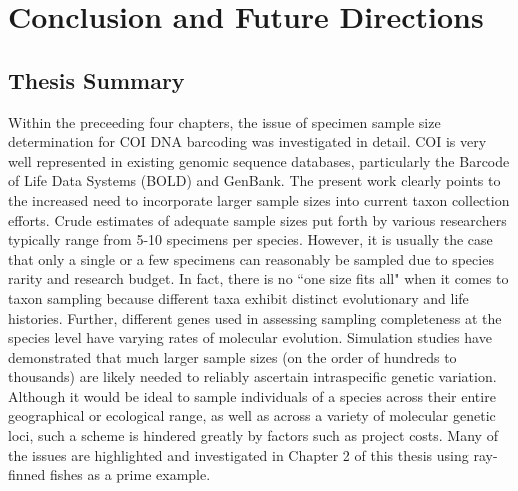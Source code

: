 \linespread{1.0}

\chapter{Conclusion and Future Directions}
\section{Thesis Summary} \label{sec:intro1}

Within the preceeding four chapters, the issue of specimen sample size determination for COI DNA barcoding was investigated in detail. COI is very well represented in existing genomic sequence databases, particularly the Barcode of Life Data Systems (BOLD) and GenBank. The present work clearly points to the increased need to incorporate larger sample sizes into current taxon collection efforts. Crude estimates of adequate sample sizes put forth by various researchers typically range from 5-10 specimens per species. However, it is usually the case that only a single or a few specimens can reasonably be sampled due to species rarity and research budget. In fact, there is no ``one size fits all" when it comes to taxon sampling because different taxa exhibit distinct evolutionary and life histories. Further, different genes used in assessing sampling completeness at the species level have varying rates of molecular evolution. Simulation studies have demonstrated that much larger sample sizes (on the order of hundreds to thousands) are likely needed to reliably ascertain intraspecific genetic variation. Although it would be ideal to sample individuals of a species across their entire geographical or ecological range, as well as across a variety of molecular genetic loci, such a scheme is hindered greatly by factors such as project costs. Many of the issues are highlighted and investigated in Chapter 2 of this thesis using ray-finned fishes as a prime example.

